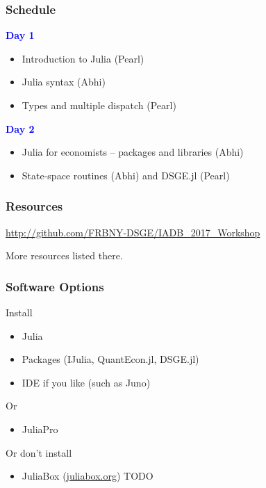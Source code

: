 \documentclass[
  xcolor={svgnames},
  hyperref={colorlinks,citecolor=DeepPink4,linkcolor=DarkRed,urlcolor=DarkBlue}
  ]{beamer}  %
\newcommand\boldblue[1]{\textcolor{blue}{\textbf{#1}}}
\begin{document}
\begin{frame}
  \frametitle{Schedule}

  \boldblue{Day 1}
  \begin{itemize}
    \item Introduction to Julia (Pearl)
    \item Julia syntax (Abhi)
    \item Types and multiple dispatch (Pearl)
  \end{itemize}

  \vspace{1em}
  \boldblue{Day 2}
  \begin{itemize}
    \item Julia for economists -- packages and libraries (Abhi)
    \item State-space routines (Abhi) and DSGE.jl (Pearl)
  \end{itemize}
\end{frame}


\begin{frame}
  \frametitle{Resources}

  \begin{center}
  \href{http://github.com/FRBNY-DSGE/IADB\_2017\_Workshop}{http://github.com/FRBNY-DSGE/IADB\_2017\_Workshop}
  \end{center}
  \vspace{2em}

  More resources listed there.
\end{frame}


\begin{frame}
  \frametitle{Software Options}

  Install
  \begin{itemize}
    \item Julia
    \item Packages (IJulia, QuantEcon.jl, DSGE.jl)
    \item IDE if you like (such as Juno)
  \end{itemize}

  \vspace{1em}
  Or
  \begin{itemize}
    \item JuliaPro
  \end{itemize}

  \vspace{1em}
  Or don't install
  \begin{itemize}
    \item JuliaBox (\href{juliabox.org}{juliabox.org}) TODO
  \end{itemize}

\end{frame}
\end{document}
